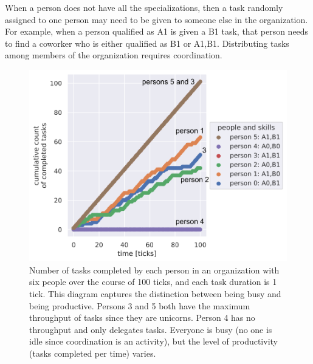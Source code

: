 When a person does not have all the specializations, then a task randomly assigned to one person may need to be given to someone else in the organization. For example, when a person qualified as A1 is given a B1 task, that person needs to find a coworker who is either qualified as B1 or A1,B1. Distributing tasks among members of the organization requires coordination.




\begin{figure}[H] %
\centering
\iftoggle{narrowpage}{\newcommand\imgwidth{1}}{\newcommand\imgwidth{0.7}}
\includegraphics[width=\imgwidth\textwidth]{images/task_distribution_tasks_per_person_simCount1_skills2_levels1_taskduration1_people6_social0_ticks100_annotated_flattened.pdf}
\caption{Number of tasks completed by each person in an organization with six people over the course of 100 ticks, and each task duration is 1 tick. This diagram captures the distinction between being busy and being productive. Persons 3 and 5 both have the maximum throughput of tasks since they are unicorns. Person 4 has no throughput and only delegates tasks. Everyone is busy (no one is idle since coordination is an activity), but the level of productivity (tasks completed per time) varies.}
\label{fig:task-distribution-tasks-per-person}
\end{figure}



